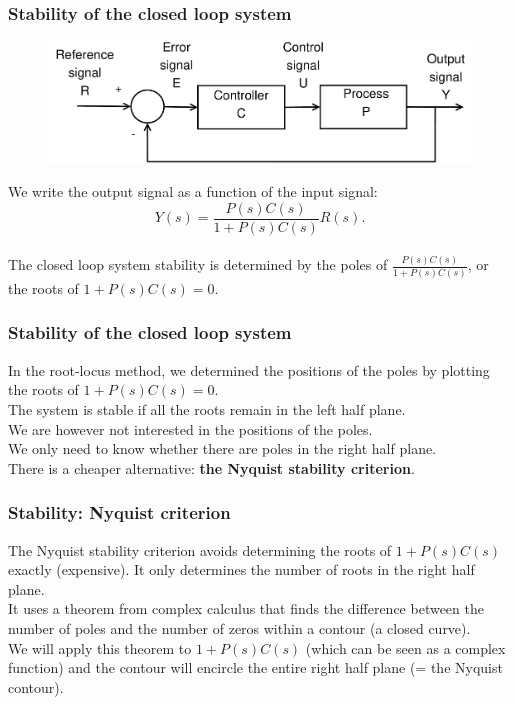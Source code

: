 \begin{frame}
	\frametitle{Stability of the closed loop system}
	\begin{figure}
		\includegraphics[width=0.8\linewidth]{closedloop}
	\end{figure}
	We write the output signal as a function of the input signal: $$Y(s)=\frac{P(s)C(s)}{1+P(s)C(s)}R(s).$$\\
	The closed loop system stability is determined by the poles of $\frac{P(s)C(s)}{1+P(s)C(s)}$, or the roots of $1+P(s)C(s)=0$.
\end{frame}

\begin{frame}
	\frametitle{Stability of the closed loop system}
	\vspace{-8ex}
	In the root-locus method, we determined the positions of the poles by plotting the roots of $1+P(s)C(s)=0$.\\
	\medskip
	The system is stable if all the roots remain in the left half plane.\\
	\medskip
	We are however not interested in the positions of the poles.\\
	We only need to know whether there are poles in the right half plane.\\
	\medskip
	There is a cheaper alternative: \textbf{the Nyquist stability criterion}.
\end{frame}

\begin{frame}
	\frametitle{Stability: Nyquist criterion}
	\vspace{-5ex}
	The Nyquist stability criterion avoids determining the roots of $1+P(s)C(s)$ exactly (expensive). It only determines the number of roots in the right half plane.\\
	\medskip
	It uses a theorem from complex calculus that finds the difference between the number of poles and the number of zeros within a contour (a closed curve).\\
	\medskip
	We will apply this theorem to $1+P(s)C(s)$ (which can be seen as a complex function) and the contour will encircle the entire right half plane (= the Nyquist contour).
\end{frame}

